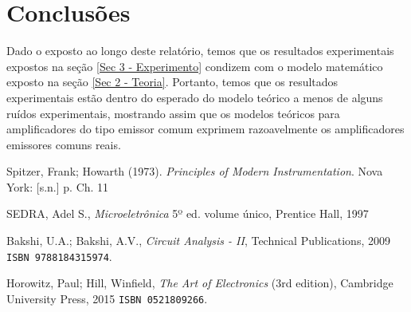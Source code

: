 \documentclass[letterpaper, 12pt]{article}
\begin{document}
\section{Conclusões}\label{Sec 5 - Conclusão}
Dado o exposto ao longo deste relatório, temos que os resultados experimentais expostos na seção \ref{Sec 3 - Experimento} condizem com o modelo matemático exposto na seção \ref{Sec 2 - Teoria}. Portanto, temos que os resultados experimentais estão dentro do esperado do modelo teórico a menos de alguns ruídos experimentais, mostrando assim que os modelos teóricos para amplificadores do tipo emissor comum exprimem razoavelmente os amplificadores emissores comuns reais.



\begin{thebibliography}{100}

Spitzer, Frank; Howarth (1973). \textit{Principles of Modern Instrumentation}. Nova York: [s.n.] p. Ch. 11

SEDRA, Adel S., \textit{Microeletrônica} 5º ed. volume único, Prentice Hall, 1997

Bakshi, U.A.; Bakshi, A.V., \textit{Circuit Analysis - II}, Technical Publications, 2009 \texttt{ISBN 9788184315974}.

Horowitz, Paul; Hill, Winfield, \textit{The Art of Electronics} (3rd edition), Cambridge University Press, 2015 \texttt{ISBN 0521809266}.

\end{thebibliography}
\end{document}

